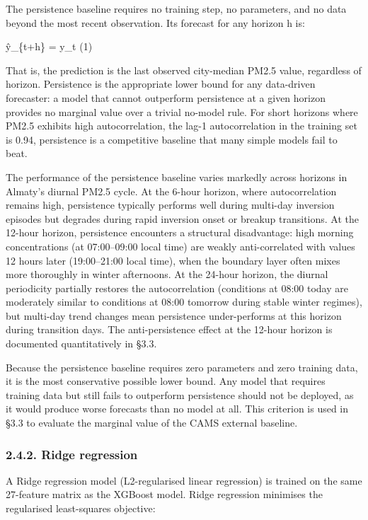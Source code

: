 The persistence baseline requires no training step, no parameters, and no data beyond the most recent observation. Its forecast for any horizon h is:

ŷ\_\{t+h\} = y\_t (1)

That is, the prediction is the last observed city-median PM2.5 value, regardless of horizon. Persistence is the appropriate lower bound for any data-driven forecaster: a model that cannot outperform persistence at a given horizon provides no marginal value over a trivial no-model rule. For short horizons where PM2.5 exhibits high autocorrelation, the lag-1 autocorrelation in the training set is 0.94, persistence is a competitive baseline that many simple models fail to beat.

The performance of the persistence baseline varies markedly across horizons in Almaty's diurnal PM2.5 cycle. At the 6-hour horizon, where autocorrelation remains high, persistence typically performs well during multi-day inversion episodes but degrades during rapid inversion onset or breakup transitions. At the 12-hour horizon, persistence encounters a structural disadvantage: high morning concentrations (at 07:00--09:00 local time) are weakly anti-correlated with values 12 hours later (19:00--21:00 local time), when the boundary layer often mixes more thoroughly in winter afternoons. At the 24-hour horizon, the diurnal periodicity partially restores the autocorrelation (conditions at 08:00 today are moderately similar to conditions at 08:00 tomorrow during stable winter regimes), but multi-day trend changes mean persistence under-performs at this horizon during transition days. The anti-persistence effect at the 12-hour horizon is documented quantitatively in §3.3.

Because the persistence baseline requires zero parameters and zero training data, it is the most conservative possible lower bound. Any model that requires training data but still fails to outperform persistence should not be deployed, as it would produce worse forecasts than no model at all. This criterion is used in §3.3 to evaluate the marginal value of the CAMS external baseline.

\subsubsection{2.4.2. Ridge regression}\label{ridge-regression}

A Ridge regression model (L2-regularised linear regression) is trained on the same 27-feature matrix as the XGBoost model. Ridge regression minimises the regularised least-squares objective:

